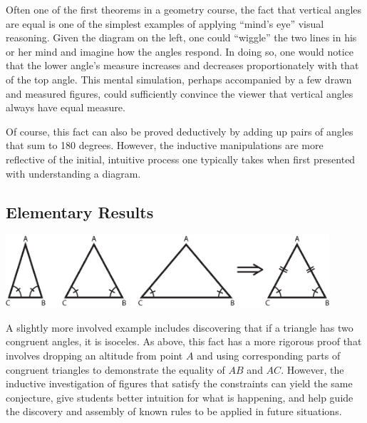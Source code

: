 
Often one of the first theorems in a geometry course, the fact that
vertical angles are equal is one of the simplest examples of applying
``mind's eye'' visual reasoning.  Given the diagram on the left, one
could ``wiggle'' the two lines in his or her mind and imagine how the
angles respond.  In doing so, one would notice that the lower angle's
measure increases and decreases proportionately with that of the top
angle.  This mental simulation, perhaps accompanied by a few drawn and
measured figures, could sufficiently convince the viewer that vertical
angles always have equal measure.

Of course, this fact can also be proved deductively by adding up pairs
of angles that sum to 180 degrees.  However, the inductive
manipulations are more reflective of the initial, intuitive process
one typically takes when first presented with understanding a diagram.

\subsection{Elementary Results}
\label{sec:elem}

\begin{center}
\includegraphics[width=0.9\textwidth]{diagrams/isoceles-triangle.eps}
\end{center}


A slightly more involved example includes discovering that if a
triangle has two congruent angles, it is isoceles.  As above, this
fact has a more rigorous proof that involves dropping an altitude from
point $A$ and using corresponding parts of congruent triangles to
demonstrate the equality of $AB$ and $AC$.  However, the inductive
investigation of figures that satisfy the constraints can yield the
same conjecture, give students better intuition for what is happening,
and help guide the discovery and assembly of known rules to be applied
in future situations.


